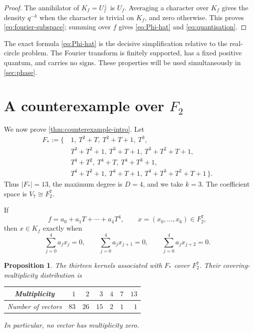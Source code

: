 \documentclass[11pt,reqno]{amsart}
\numberwithin{equation}{section}
\newtheorem{proposition}[proposition]{Proposition}
\theoremstyle{definition}
\theoremstyle{remark}
\newcommand{\cF}{\mathcal F}
\newcommand{\abs}[1]{\lvert#1\rvert}
\def\mathbb#1{#1}%
\def\mathcal#1{#1}%
\begin{document}
\begin{proof}
The annihilator of $K_f=U_f^\perp$ is $U_f$.  Averaging a character over $K_f$ gives the density $q^{-k}$ when the character is trivial on $K_f$, and zero otherwise.  This proves \eqref{eq:fourier-subspace}; summing over $f$ gives \eqref{eq:Phi-hat} and \eqref{eq:quantisation}.
\end{proof}

The exact formula \eqref{eq:Phi-hat} is the decisive simplification relative to the real-circle problem.  The Fourier transform is finitely supported, has a fixed positive quantum, and carries no signs.  These properties will be used simultaneously in \cref{sec:phase}.

\section{A counterexample over \texorpdfstring{$\mathbb F_2$}{F2}}\label{sec:counterexample}

We now prove \cref{thm:counterexample-intro}.  Let
\begin{align*}
\cF_*:=\{\,&1,\ T^2+T,\ T^2+T+1,\ T^3,\\
& T^3+T^2+1,\ T^3+T+1,\ T^3+T^2+T+1,\\
& T^4+T^2,\ T^4+T,\ T^4+T^3+1,\\
& T^4+T^2+1,\ T^4+T+1,\ T^4+T^3+T^2+T+1\,\}.
\end{align*}
Thus $\abs{\cF_*}=13$, the maximum degree is $D=4$, and we take $k=3$.  The coefficient space is
$V_7\cong\mathbb F_2^7$.

If
\[
 f=a_0+a_1T+\cdots+a_4T^4,
 \qquad
 x=(x_0,\ldots,x_6)\in\mathbb F_2^7,
\]
then $x\in K_f$ exactly when
\begin{equation}\label{eq:counter-kernel}
 \sum_{j=0}^4a_jx_j=0,
 \qquad
 \sum_{j=0}^4a_jx_{j+1}=0,
 \qquad
 \sum_{j=0}^4a_jx_{j+2}=0.
\end{equation}

\begin{proposition}\label{prop:certificate}
The thirteen kernels associated with $\cF_*$ cover $\mathbb F_2^7$.  Their covering-multiplicity distribution is
\begin{center}
\begin{tabular}{c|rrrrrr}
\toprule
Multiplicity & $1$ & $2$ & $3$ & $4$ & $7$ & $13$\\
\midrule
Number of vectors & $83$ & $26$ & $15$ & $2$ & $1$ & $1$\\
\bottomrule
\end{tabular}
\end{center}
In particular, no vector has multiplicity zero.
\end{proposition}
\end{document}
